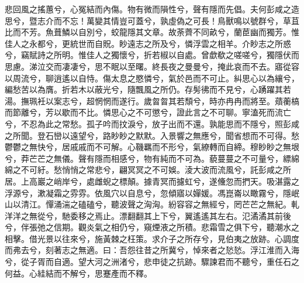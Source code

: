 
\begin{pinyinscope}
悲回風之搖蕙兮，心冤結而內傷。物有微而隕性兮，聲有隱而先倡。夫何彭咸之造思兮，暨志介而不忘！萬變其情豈可蓋兮，孰虛偽之可長！鳥獸鳴以號群兮，草苴比而不芳。魚葺鱗以自別兮，蛟龍隱其文章。故荼薺不同畝兮，蘭茞幽而獨芳。惟佳人之永都兮，更統世而自貺。眇遠志之所及兮，憐浮雲之相羊。介眇志之所惑兮，竊賦詩之所明。惟佳人之獨懷兮，折若椒以自處。曾歔欷之嗟嗟兮，獨隱伏而思慮。涕泣交而凄凄兮，思不眠以至曙。終長夜之曼曼兮，掩此哀而不去。寤從容以周流兮，聊逍遙以自恃。傷太息之愍憐兮，氣於邑而不可止。糾思心以為纕兮，編愁苦以為膺。折若木以蔽光兮，隨飄風之所仍。存髣彿而不見兮，心踴躍其若湯。撫珮衽以案志兮，超惘惘而遂行。歲曶曶其若頹兮，時亦冉冉而將至。薠蘅槁而節離兮，芳以歇而不比。憐思心之不可懲兮，證此言之不可聊。寧溘死而流亡兮，不忍為此之常愁。孤子吟而抆淚兮，放子出而不還。孰能思而不隱兮，照彭咸之所聞。登石巒以遠望兮，路眇眇之默默。入景響之無應兮，聞省想而不可得。愁鬱鬱之無快兮，居戚戚而不可解。心鞿羈而不形兮，氣繚轉而自締。穆眇眇之無垠兮，莽芒芒之無儀。聲有隱而相感兮，物有純而不可為。藐蔓蔓之不可量兮，縹綿綿之不可紆。愁悄悄之常悲兮，翩冥冥之不可娛。淩大波而流風兮，託彭咸之所居。上高巖之峭岸兮，處雌蜺之標顛。據青冥而攄虹兮，遂儵忽而捫天。吸湛露之浮源兮，漱凝霜之雰雰。依風穴以自息兮，忽傾寤以嬋媛。馮崑崙以瞰霧兮，隱岷山以清江。憚涌湍之磕磕兮，聽波聲之洶洶。紛容容之無經兮，罔芒芒之無紀。軋洋洋之無從兮，馳委移之焉止。漂翻翻其上下兮，翼遙遙其左右。氾潏潏其前後兮，伴張弛之信期。觀炎氣之相仍兮，窺煙液之所積。悲霜雪之俱下兮，聽潮水之相擊。借光景以往來兮，施黃棘之枉策。求介子之所存兮，見伯夷之放跡。心調度而弗去兮，刻著志之無適。曰：吾怨往昔之所冀兮，悼來者之悐悐。浮江淮而入海兮，從子胥而自適。望大河之洲渚兮，悲申徒之抗跡。驟諫君而不聽兮，重任石之何益。心絓結而不解兮，思蹇產而不釋。


\end{pinyinscope}